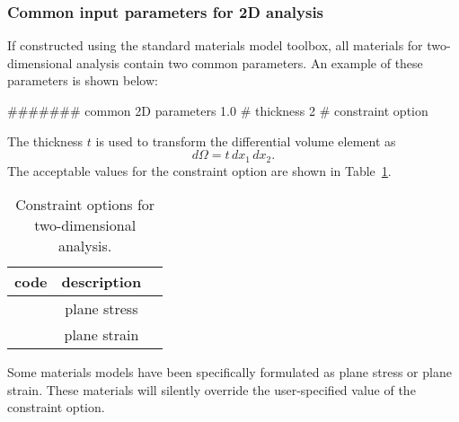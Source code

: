 \subsubsection{Common input parameters for 2D analysis}
\label{sect.material.2D.common}
If constructed using the standard \tahoe materials model toolbox, all 
materials for two-dimensional analysis contain two common parameters.
An example of these parameters is shown below:
\begin{inputfile}
####### common 2D parameters
1.0   # thickness
2     # constraint option
\end{inputfile}
The thickness $t$ is used to transform the differential volume element
as
\begin{equation}
	d\Omega = t\,dx_{1}\,dx_{2}.
\end{equation}
The acceptable values for the constraint option are shown in 
Table~\ref{tab.2Dconstraint}.
\begin{table}[h]
\caption{\label{tab.2Dconstraint} Constraint options for 
two-dimensional analysis.}
\begin{center}
\begin{tabular}[c]{|l|c|c|}
\hline
 \parbox[b]{0.75in}{\centering \textbf{code}}
&\parbox[b]{2.0in}{\raggedright \textbf{description}}\\
\hline
\parbox[b]{0.75in}{} & 
\parbox[b]{2.0in}{\raggedright plane stress}\\
\hline
\parbox[b]{0.75in}{}  & 
\parbox[b]{2.0in}{\raggedright plane strain}\\
\hline
\end{tabular}
\end{center}
\end{table}
Some materials models have been specifically formulated as plane 
stress or plane strain. These materials will silently 
override the user-specified value of the constraint option.

